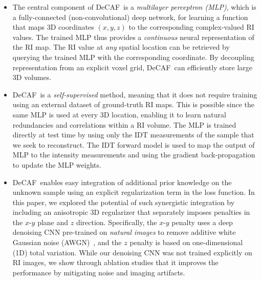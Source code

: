 \documentclass[11pt]{article}
\theoremstyle{plain} %
\def\proposed{DeCAF}
\begin{document}
\begin{itemize}

\item The central component of \proposed~is a \emph{multilayer perceptron (MLP)}, which is a fully-connected (non-convolutional) deep network, for learning a function that maps 3D coordinates $(x,y,z)$  to the corresponding complex-valued RI values. The trained MLP thus provides a \emph{continuous} neural representation of the RI map. The RI value at \emph{any} spatial location can be retrieved by querying the trained MLP with the corresponding coordinate. 
By decoupling representation from an explicit voxel grid, \proposed~can efficiently store large 3D volumes.

\item \proposed~is a \emph{self-supervised} method, meaning that it does not require training using an external dataset of ground-truth RI maps. This is possible since the same MLP is used at every 3D location, enabling it to learn natural redundancies and correlations within a RI volume. The MLP is trained directly at test time by using only the IDT measurements of the sample that we seek to reconstruct. The IDT forward model is used to map the output of MLP to the intensity measurements and using the gradient back-propagation to update the MLP weights.

\item \proposed~enables easy integration of additional prior knowledge on the unknown sample using an explicit regularization term in the loss function. In this paper, we explored the potential of such synergistic integration by including an anisotropic 3D regularizer that separately imposes penalties in the $x$-$y$ plane and $z$ direction. 
Specifically, the $x$-$y$ penalty uses a deep denoising CNN pre-trained on \emph{natural images} to remove additive white Gaussian noise (AWGN)~\cite{Sun.etal2020, Sun.etal2021}, and the $z$ penalty is based on one-dimensional (1D) total variation. 
While our denoising CNN was not trained explicitly on RI images, we show through ablation studies that it improves the performance by mitigating noise and imaging artifacts.
\end{itemize}
\end{document}

